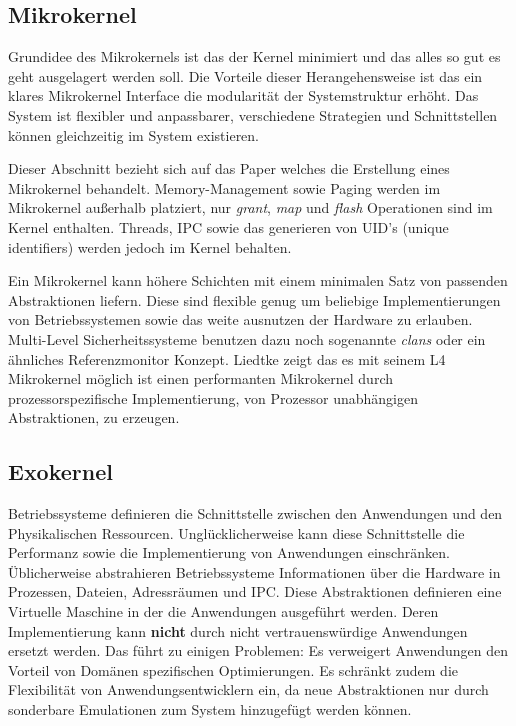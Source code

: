 \documentclass[11pt,technote]{IEEEtran}
\begin{document}
    \subsection{Mikrokernel}
	    Grundidee des Mikrokernels ist das der Kernel minimiert und das alles so gut es geht ausgelagert werden soll.
	    Die Vorteile dieser Herangehensweise ist das ein klares Mikrokernel Interface die modularit\"at der Systemstruktur erh\"oht.
	    Das System ist flexibler und anpassbarer, verschiedene Strategien und Schnittstellen k\"onnen gleichzeitig im System existieren.
	    
	    Dieser Abschnitt bezieht sich auf das Paper \cite{inproc:micro} welches die Erstellung eines Mikrokernel behandelt.
	    Memory-Management sowie Paging werden im Mikrokernel au\ss erhalb platziert, nur \textit{grant}, \textit{map} und \textit{flash} Operationen sind im Kernel 
	    enthalten. \cite[S. 238 f]{inproc:micro} Threads, IPC sowie das generieren von UID's (unique identifiers) werden jedoch im Kernel behalten.
	    
	    Ein Mikrokernel kann h\"ohere Schichten mit einem minimalen Satz von passenden Abstraktionen liefern.
	    Diese sind flexible genug um beliebige Implementierungen von Betriebssystemen sowie das weite ausnutzen der Hardware zu erlauben.
	    Multi-Level Sicherheitssysteme benutzen dazu noch sogenannte \textit{clans} oder ein \"ahnliches Referenzmonitor Konzept.        
	    Liedtke zeigt das es mit seinem L4 Mikrokernel m\"oglich ist einen performanten Mikrokernel durch prozessorspezifische Implementierung, 
	    von Prozessor unabh\"angigen Abstraktionen, zu erzeugen.\cite[S. 248]{inproc:micro}
   
    \subsection{Exokernel}       
      Betriebssysteme definieren die Schnittstelle zwischen den Anwendungen und den Physikalischen Ressourcen.
      Ungl\"ucklicherweise kann diese Schnittstelle die Performanz sowie die Implementierung von Anwendungen einschr\"anken. \"Ublicherweise
      abstrahieren Betriebssysteme Informationen \"uber die Hardware in Prozessen, Dateien, Adressr\"aumen und IPC. Diese Abstraktionen definieren eine 
      Virtuelle Maschine in der die Anwendungen ausgef\"uhrt werden. Deren Implementierung kann \textbf{nicht} durch nicht vertrauensw\"urdige Anwendungen
      ersetzt werden. Das f\"uhrt zu einigen Problemen: Es verweigert Anwendungen den Vorteil von Dom\"anen spezifischen Optimierungen.
      Es schr\"ankt zudem die Flexibilit\"at von Anwendungsentwicklern ein, da neue Abstraktionen nur durch sonderbare Emulationen zum
      System hinzugef\"ugt werden k\"onnen.
        
\end{document}
